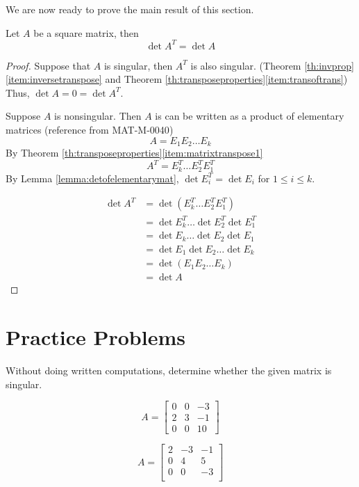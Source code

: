 \documentclass{ximera}
\begin{document}
We are now ready to prove the main result of this section.

\begin{theorem}\label{th:detoftrans}
Let $A$ be a square matrix, then
$$\det{A^T}=\det{A}$$
\end{theorem}

\begin{proof}
Suppose that $A$ is singular, then $A^T$ is also singular. (Theorem \ref{th:invprop}\ref{item:inversetranspose} and Theorem \ref{th:transposeproperties}\ref{item:transoftrans}) Thus, $\det{A}=0=\det{A^T}$.

Suppose $A$ is nonsingular.  Then $A$ is can be written as a product of elementary matrices ({\color{red}reference from MAT-M-0040})
$$A=E_1E_2\ldots E_k$$
By Theorem \ref{th:transposeproperties}\ref{item:matrixtranspose1}
$$A^T=E_k^T\ldots E_2^TE_1^T$$
By Lemma \ref{lemma:detofelementarymat}, $\det{E_i^T}=\det{E_i}$ for $1\leq i\leq k$.

\begin{align*}
\det{A^T}&=\det{(E_k^T\ldots E_2^TE_1^T)}\\
&=\det{E_k^T}\ldots \det{E_2^T}\det{E_1^T}\\
&=\det{E_k}\ldots \det{E_2}\det{E_1}\\
&=\det{E_1}\det{E_2}\ldots\det{E_k}\\
&=\det{(E_1E_2\ldots E_k)}\\
&=\det{A}
\end{align*}
\end{proof}

\section*{Practice Problems}
\begin{problem}
Without doing written computations, determine whether the given matrix is singular. 
  \begin{problem}
  $$A=\begin{bmatrix}0&0&-3\\2&3&-1\\0&0&10\end{bmatrix}$$
  \begin{multipleChoice}
  \end{multipleChoice}
  \end{problem}

\begin{problem}
  $$A=\begin{bmatrix}2&-3&-1\\0&4&5\\0&0&-3\\\end{bmatrix}$$
  \begin{multipleChoice}
  \end{multipleChoice}
  \end{problem}

\end{problem}
\end{document}
